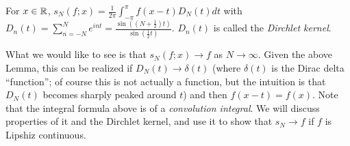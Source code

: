 \begin{nlemma}{}{}
    For $x \in \mathbb{R}$, $s_N(f;x) = \frac{1}{2\pi}\int_{-\pi}^\pi f(x - t)D_N(t)dt$ with $D_n(t) = \sum_{n=-N}^{N}e^{int} = \frac{\sin((N + \frac{1}{2})t)}{\sin(\frac{1}{2}t)}$. $D_n(t)$ is called the \emph{Dirchlet kernel}.
\end{nlemma}
\noindent What we would like to see is that $s_N(f;x) \rightarrow f$ as $N \rightarrow \infty$. Given the above Lemma, this can be realized if $D_N(t) \rightarrow \delta(t)$ (where $\delta(t)$ is the Dirac delta ``function''; of course this is not actually a function, but the intuition is that $D_N(t)$ becomes sharply peaked around $t$) and then $f(x - t) = f(x)$. Note that the integral formula above is of a \emph{convolution integral}. We will discuss properties of it and the Dirchlet kernel, and use it to show that $s_N \rightarrow f$ if $f$ is Lipshiz continuous.

